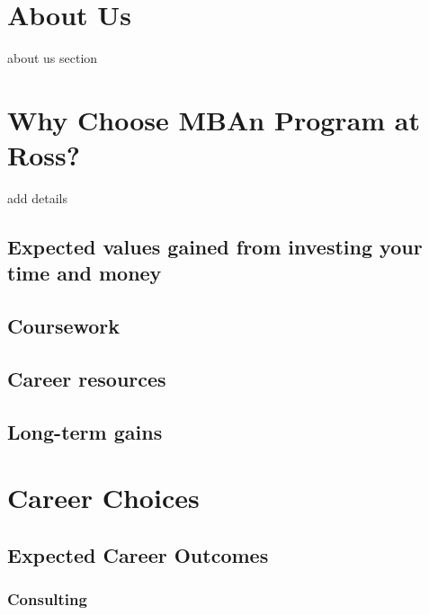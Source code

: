 \documentclass[
]{book}
\begin{document}
\hypertarget{about-us}{%
\chapter{About Us}\label{about-us}}

about us section

\hypertarget{why-choose-mban-program-at-ross}{%
\chapter{Why Choose MBAn Program at Ross?}\label{why-choose-mban-program-at-ross}}

add details

\hypertarget{expected-values-gained-from-investing-your-time-and-money}{%
\section{Expected values gained from investing your time and money}\label{expected-values-gained-from-investing-your-time-and-money}}

\hypertarget{coursework}{%
\section{Coursework}\label{coursework}}

\hypertarget{career-resources}{%
\section{Career resources}\label{career-resources}}

\hypertarget{long-term-gains}{%
\section{Long-term gains}\label{long-term-gains}}

\hypertarget{career-choices}{%
\chapter{Career Choices}\label{career-choices}}

\hypertarget{expected-career-outcomes}{%
\section{Expected Career Outcomes}\label{expected-career-outcomes}}

\hypertarget{consulting}{%
\subsection{Consulting}\label{consulting}}
\end{document}
